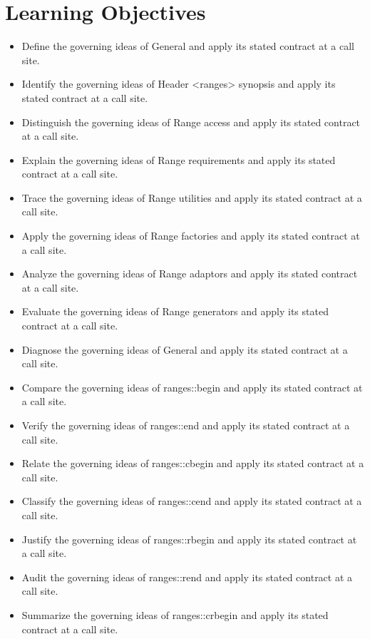 \documentclass[11pt,letterpaper]{article}
\begin{document}
\section{Learning Objectives}
\begin{itemize}[label=\textcolor{CornellReferenceTeal}{$\blacktriangleright$}]
\item Define the governing ideas of General and apply its stated contract at a call site.
\item Identify the governing ideas of Header <ranges> synopsis and apply its stated contract at a call site.
\item Distinguish the governing ideas of Range access and apply its stated contract at a call site.
\item Explain the governing ideas of Range requirements and apply its stated contract at a call site.
\item Trace the governing ideas of Range utilities and apply its stated contract at a call site.
\item Apply the governing ideas of Range factories and apply its stated contract at a call site.
\item Analyze the governing ideas of Range adaptors and apply its stated contract at a call site.
\item Evaluate the governing ideas of Range generators and apply its stated contract at a call site.
\item Diagnose the governing ideas of General and apply its stated contract at a call site.
\item Compare the governing ideas of ranges::begin and apply its stated contract at a call site.
\item Verify the governing ideas of ranges::end and apply its stated contract at a call site.
\item Relate the governing ideas of ranges::cbegin and apply its stated contract at a call site.
\item Classify the governing ideas of ranges::cend and apply its stated contract at a call site.
\item Justify the governing ideas of ranges::rbegin and apply its stated contract at a call site.
\item Audit the governing ideas of ranges::rend and apply its stated contract at a call site.
\item Summarize the governing ideas of ranges::crbegin and apply its stated contract at a call site.
\end{itemize}
\end{document}

